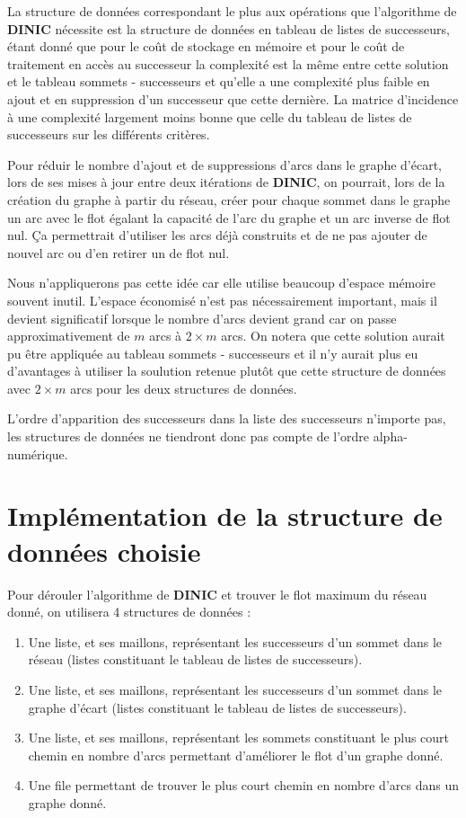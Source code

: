 \documentclass[11pt, a4paper]{report}
\begin{document}
    La structure de données correspondant le plus aux opérations que l'algorithme de \textbf{DINIC} nécessite est la structure de données en tableau de listes de successeurs, étant donné que pour le coût de stockage en mémoire et pour le coût de traitement en accès au successeur la complexité est la même entre cette solution et le tableau sommets - successeurs et qu'elle a une complexité plus faible en ajout et en suppression d'un successeur que cette dernière. La matrice d'incidence à une complexité largement moins bonne que celle du tableau de listes de successeurs sur les différents critères.
    
    Pour réduir le nombre d'ajout et de suppressions d'arcs dans le graphe d'écart, lors de ses mises à jour entre deux itérations de \textbf{DINIC}, on pourrait, lors de la création du graphe à partir du réseau, créer pour chaque sommet dans le graphe un arc avec le flot égalant la capacité de l'arc du graphe et un arc inverse de flot nul. Ça permettrait d'utiliser les arcs déjà construits et de ne pas ajouter de nouvel arc ou d'en retirer un de flot nul.
    
    Nous n'appliquerons pas cette idée car elle utilise beaucoup d'espace mémoire souvent inutil. L'espace économisé n'est pas nécessairement important, mais il devient significatif lorsque le nombre d'arcs devient grand car on passe approximativement de $m$ arcs à $2 \times m$ arcs. On notera que cette solution aurait pu être appliquée au tableau sommets - successeurs et il n'y aurait plus eu d'avantages à utiliser la soulution retenue plutôt que cette structure de données avec $2 \times m$ arcs pour les deux structures de données.
    
    L'ordre d'apparition des successeurs dans la liste des successeurs n'importe pas, les structures de données ne tiendront donc pas compte de l'ordre alpha-numérique.
    
	\section{Implémentation de la structure de données choisie}
	
	Pour dérouler l'algorithme de \textbf{DINIC} et trouver le flot maximum du réseau donné, on utilisera 4 structures de données : 
	\begin{enumerate}
		\item Une liste, et ses maillons, représentant les successeurs d'un sommet dans le réseau (listes constituant le tableau de listes de successeurs).
		\item Une liste, et ses maillons, représentant les successeurs d'un sommet dans le graphe d'écart (listes constituant le tableau de listes de successeurs).
		\item Une liste, et ses maillons, représentant les sommets constituant le plus court chemin en nombre d'arcs permettant d'améliorer le flot d'un graphe donné.
		\item Une file permettant de trouver le plus court chemin en nombre d'arcs dans un graphe donné.
	\end{enumerate}
	
\end{document}
